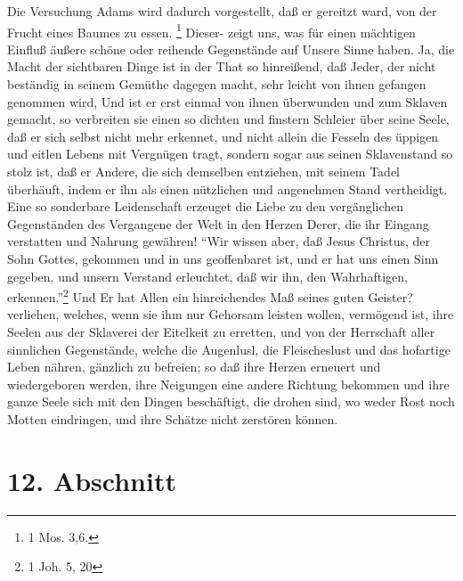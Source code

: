Die Versuchung Adams wird dadurch vorgestellt, daß er gereitzt ward, von der Frucht eines Baumes zu essen. \footnote{1 Mos. 3,6.} Dieser- zeigt uns, was für einen mächtigen Einfluß äußere schöne oder reihende Gegenstände auf Unsere Sinne haben. Ja, die Macht der sichtbaren Dinge ist in der That so hinreißend, daß Jeder, der nicht beständig in seinem Gemüthe dagegen macht, sehr leicht von ihnen gefangen genommen wird, Und ist er erst einmal von ihnen überwunden und zum Sklaven gemacht, so verbreiten sie einen so dichten und finstern Schleier über seine Seele, daß er sich selbst nicht mehr erkennet, und nicht allein die Fesseln des üppigen und eitlen Lebens mit Vergnügen tragt, sondern sogar aus seinen Sklavenstand so stolz ist, daß er Andere, die sich demselben entziehen, mit seinem Tadel überhäuft, indem er ihn als einen nützlichen und angenehmen Stand vertheidigt. Eine so sonderbare Leidenschaft erzeuget die Liebe zu den vergänglichen Gegenständen des Vergangene der Welt in den Herzen Derer, die ihr Eingang verstatten und Nahrung gewähren! "`Wir wissen aber, daß Jesus Christus, der Sohn Gottes, gekommen und in uns geoffenbaret ist, und er hat uns einen Sinn gegeben, und unsern Verstand erleuchtet, daß wir ihn, den Wahrhaftigen, erkennen."'\footnote{1 Joh. 5, 20} Und Er hat Allen ein hinreichendes Maß seines guten Geister? verliehen, welches, wenn sie ihm nur Gehorsam leisten wollen, vermögend ist, ihre Seelen aus der Sklaverei der Eitelkeit zu erretten, und von der Herrschaft aller sinnlichen Gegenstände, welche die Augenlusl, die Fleischeslust und das hofartige Leben nähren, gänzlich zu befreien; so daß ihre Herzen erneuert und wiedergeboren werden, ihre Neigungen eine andere Richtung bekommen und ihre ganze Seele sich mit den Dingen beschäftigt, die drohen sind, wo weder Rost noch Motten eindringen, und ihre Schätze nicht zerstören können.

\section{12. Abschnitt}

